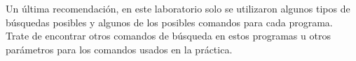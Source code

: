 \begin{itemize}
Un \'ultima recomendaci\'on, en este laboratorio solo se utilizaron algunos tipos de b\'usquedas posibles y algunos de los posibles comandos para cada programa. Trate de encontrar otros comandos de b\'usqueda en estos programas u otros par\'ametros para los comandos usados en la pr\'actica.


\end{itemize}


